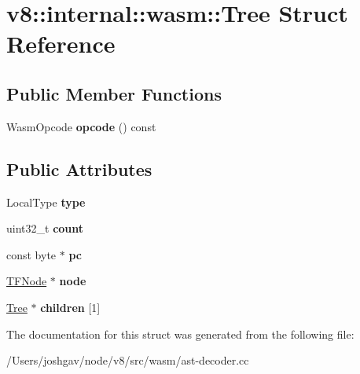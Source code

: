 \hypertarget{structv8_1_1internal_1_1wasm_1_1_tree}{}\section{v8\+:\+:internal\+:\+:wasm\+:\+:Tree Struct Reference}
\label{structv8_1_1internal_1_1wasm_1_1_tree}
\subsection*{Public Member Functions}
\begin{DoxyCompactItemize}
\item 
Wasm\+Opcode {\bfseries opcode} () const \hypertarget{structv8_1_1internal_1_1wasm_1_1_tree_ad3e34096a7760b04c13494947ad148c8}{}\label{structv8_1_1internal_1_1wasm_1_1_tree_ad3e34096a7760b04c13494947ad148c8}

\end{DoxyCompactItemize}
\subsection*{Public Attributes}
\begin{DoxyCompactItemize}
\item 
Local\+Type {\bfseries type}\hypertarget{structv8_1_1internal_1_1wasm_1_1_tree_a5da704db756a0d7bd7207d57184c15ef}{}\label{structv8_1_1internal_1_1wasm_1_1_tree_a5da704db756a0d7bd7207d57184c15ef}

\item 
uint32\+\_\+t {\bfseries count}\hypertarget{structv8_1_1internal_1_1wasm_1_1_tree_aafd26c7367d9f87800d87b54a53e8cdc}{}\label{structv8_1_1internal_1_1wasm_1_1_tree_aafd26c7367d9f87800d87b54a53e8cdc}

\item 
const byte $\ast$ {\bfseries pc}\hypertarget{structv8_1_1internal_1_1wasm_1_1_tree_a1fe8ad3119a9b881b244b3932a873e5b}{}\label{structv8_1_1internal_1_1wasm_1_1_tree_a1fe8ad3119a9b881b244b3932a873e5b}

\item 
\hyperlink{classv8_1_1internal_1_1compiler_1_1_node}{T\+F\+Node} $\ast$ {\bfseries node}\hypertarget{structv8_1_1internal_1_1wasm_1_1_tree_aa5413f9571c38420534cee8c1d715def}{}\label{structv8_1_1internal_1_1wasm_1_1_tree_aa5413f9571c38420534cee8c1d715def}

\item 
\hyperlink{structv8_1_1internal_1_1wasm_1_1_tree}{Tree} $\ast$ {\bfseries children} \mbox{[}1\mbox{]}\hypertarget{structv8_1_1internal_1_1wasm_1_1_tree_a7266f497a94762c79cf21425029fd5e1}{}\label{structv8_1_1internal_1_1wasm_1_1_tree_a7266f497a94762c79cf21425029fd5e1}

\end{DoxyCompactItemize}


The documentation for this struct was generated from the following file\+:\begin{DoxyCompactItemize}
\item 
/\+Users/joshgav/node/v8/src/wasm/ast-\/decoder.\+cc\end{DoxyCompactItemize}
